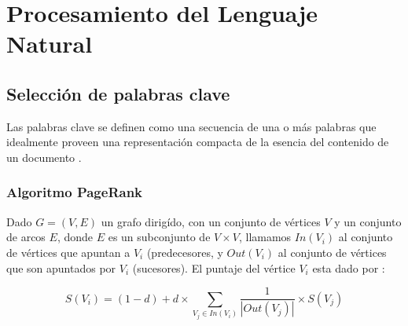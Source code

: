 \chapter{Procesamiento del Lenguaje Natural}
\section{Selecci\'on de palabras clave}
Las palabras clave se definen como una secuencia de una o m\'as palabras que 
idealmente proveen una representaci\'on compacta de la esencia del contenido de un
documento \cite{Rose2010}.
\subsection{Algoritmo PageRank}
Dado $G = (V,E)$ un grafo dirig\'ido, con un conjunto de v\'ertices $V$ y un conjunto
de arcos $E$, donde $E$ es un subconjunto de $V \times V$, llamamos $In(V_i)$ al
conjunto de v\'ertices que apuntan a $V_i$ (predecesores, y $Out(V_i)$ al conjunto
de v\'ertices que son apuntados por $V_i$ (sucesores). El puntaje del v\'ertice
$V_i$ esta dado por \cite{Brin1998107}:

\begin{equation}
	S(V_i) = (1-d)+ d \times{\sum_{V_j \in In(V_i)}{\frac{1}{|Out(V_j)|} \times S(V_j)}}
\end{equation}
